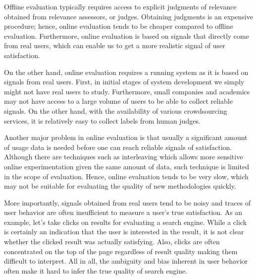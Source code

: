 Offline evaluation typically requires access to explicit judgments of relevance obtained from relevance assessors, or judges. Obtaining judgments is an expensive procedure; hence, online evaluation tends to be cheaper compared to offline evaluation. Furthermore, online evaluation is based on signals that directly come from real users, which can enable us to get a more realistic signal of user satisfaction. 

On the other hand, online evaluation requires a running system as it is based on signals from real users. First, in initial stages of system development we simply might not have real users to study. Furthermore, small companies and academics may not have access to a large volume of users to be able to collect reliable signals. On the other hand, with the availability of various crowdsourcing services, it is relatively easy to collect labels from human judges.

Another major problem in online evaluation is that usually a significant amount of usage data is needed before one can reach reliable signals of satisfaction. Although there are techniques such as interleaving \cite{radl:comp10} which allows more sensitive online experimentation given the same amount of data, such technique is limited in the scope of evaluation. Hence, online evaluation tends to be very slow, which may not be suitable for evaluating the quality of new methodologies quickly. %

More importantly, signals obtained from real users tend to be noisy and traces of user behavior are often insufficient to measure a user's true satisfaction. As an example, let's take clicks on results for evaluating a search engine. While a click is certainly an indication that the user is interested in the result, it is not clear whether the clicked result was actually satisfying. \cite{Kim2016} Also, clicks are often concentrated on the top of the page regardless of result quality  \cite{radlinski2006minimally} making them difficult to interpret. All in all, the ambiguity and bias inherent in user behavior often make it hard to infer the true quality of search engine.  

